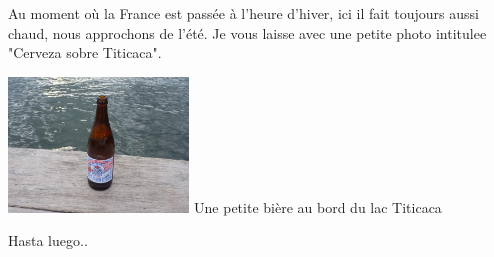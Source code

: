 \begin{multicols}{2}
Au moment où la France est passée à l'heure d'hiver, ici il fait toujours aussi chaud, nous approchons de l'été. Je vous laisse avec une petite photo intitulee "Cerveza sobre Titicaca".

\hspace*{-0.65cm}
\includegraphics[width=4.8cm]{articles/Arequipa-colca-titicaca/1256606978ASqj.jpg}
Une petite bière au bord du lac Titicaca

Hasta luego..

\end{multicols}


